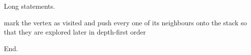 \documentclass{article}
\begin{document}
Long statements.

\begin{algorithm}[h]
\caption{Wrapping}
\begin{algorithmic}[1]
\STATE mark the vertex as visited and push every one of its neighbours onto the stack so that they are explored later in depth-first order
\ENDIF
\ENDFOR
\end{algorithmic}
\end{algorithm}

End.
\end{document}
